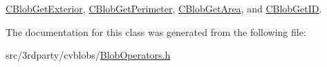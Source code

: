 \hyperlink{classCBlobGetExterior_ad272326f713272424a2b4763b27edeaa}{C\-Blob\-Get\-Exterior}, \hyperlink{classCBlobGetPerimeter_a27d6922b9fb5ad220bd0e3876aef7f28}{C\-Blob\-Get\-Perimeter}, \hyperlink{classCBlobGetArea_a3c8268e93a2271bcd878dbf13d259afb}{C\-Blob\-Get\-Area}, and \hyperlink{classCBlobGetID_a01557f50837f1e52f3b6c690c0af6592}{C\-Blob\-Get\-I\-D}.



The documentation for this class was generated from the following file\-:\begin{DoxyCompactItemize}
\item 
src/3rdparty/cvblobs/\hyperlink{BlobOperators_8h}{Blob\-Operators.\-h}\end{DoxyCompactItemize}
